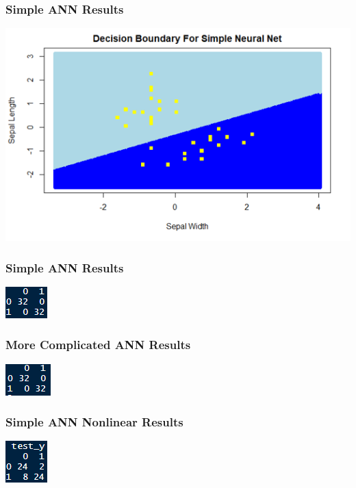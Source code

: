 \documentclass{beamer}
\begin{document}
\begin{frame}
    \frametitle{Simple ANN Results}

    \includegraphics[scale = .69]{irisplane.png}

\end{frame}

\begin{frame}
    \frametitle{Simple ANN Results}

    \centerline{\includegraphics[scale = 2]{simpleconfusionmatrix.png}}

\end{frame}

\begin{frame}
    \frametitle{More Complicated ANN Results}

    \centerline{\includegraphics[scale = 2]{nnconfusionmatrix.png}}

\end{frame}

\begin{frame}
    \frametitle{Simple ANN Nonlinear Results}

    \centerline{\includegraphics[scale = 2]{simplennnonlinear.png}}

\end{frame}
\end{document}
